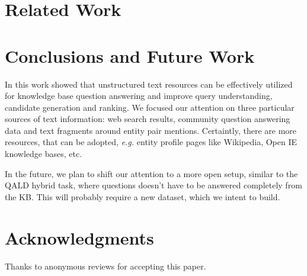 \documentclass{sig-alternate-05-2015}
\newcommand{\eg}[0]{{\em e.g. }}
\begin{document}
\section{Related Work}
\label{section:related_work}


\section{Conclusions and Future Work}

In this work showed that unstructured text resources can be effectively utilized for knowledge base question answering and improve query understanding, candidate generation and ranking.
We focused our attention on three particular sources of text information: web search results, community question answering data and text fragments around entity pair mentions.
Certaintly, there are more resources, that can be adopted, \eg entity profile pages like Wikipedia, Open IE knowledge bases, etc.

In the future, we plan to shift our attention to a more open setup, similar to the QALD hybrid task, where questions doesn't have to be answered completely from the KB.
This will probably require a new dataset, which we intent to build.



\section{Acknowledgments}
Thanks to anonymous reviews for accepting this paper.

%

%
%
\end{document}
